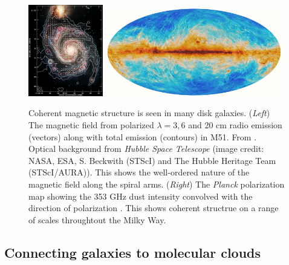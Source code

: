 \begin{figure}[t]
\begin{center}
\includegraphics[width=0.29\textwidth]{Fletcher.png}
\includegraphics[width=0.69\textwidth]{Planck.jpg}
\end{center}
\vspace{-6mm}
\caption{\label{fig:bfield_morphology} Coherent magnetic structure is seen in
many disk galaxies. (\emph{Left}) The magnetic field from
polarized $\lambda=3,6$ and 20 cm  radio emission (vectors) along with total
emission (contours) in M51. From  \cite{Fletcher11}.  Optical background from \emph{Hubble Space Telescope}
(image credit: NASA, ESA, S. Beckwith (STScI) and The Hubble Heritage Team
(STScI/AURA)).  This shows the well-ordered nature of the magnetic field along
the spiral arms. 
(\emph{Right}) The \emph{Planck} polarization map showing the 353 GHz dust
intensity convolved with the direction of polarization
\citep{PlanckIntermediateXIX15}.  This shows coherent structrue on a range of
scales throughtout the Milky Way.
}
\vspace{-3mm}
\end{figure}

\vspace{-2mm}
\subsection{Connecting galaxies to molecular clouds}
\label{sec:conngalmcs}
\vspace{-2mm}

